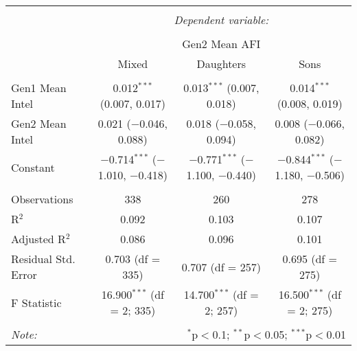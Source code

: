 
\begingroup 
\small 
\begin{tabular}{@{\extracolsep{1pt}}lccc} 
\\[-1.8ex]\hline 
\hline \\[-1.8ex] 
 & \multicolumn{3}{c}{\textit{Dependent variable:}} \\ 
\cline{2-4} 
\\[-1.8ex] & \multicolumn{3}{c}{Gen2 Mean AFI} \\ 
 & Mixed & Daughters & Sons \\ 
\hline \\[-1.8ex] 
 Gen1 Mean Intel & 0.012$^{***}$ (0.007, 0.017) & 0.013$^{***}$ (0.007, 0.018) & 0.014$^{***}$ (0.008, 0.019) \\ 
  Gen2 Mean Intel & 0.021 ($-$0.046, 0.088) & 0.018 ($-$0.058, 0.094) & 0.008 ($-$0.066, 0.082) \\ 
  Constant & $-$0.714$^{***}$ ($-$1.010, $-$0.418) & $-$0.771$^{***}$ ($-$1.100, $-$0.440) & $-$0.844$^{***}$ ($-$1.180, $-$0.506) \\ 
 \hline \\[-1.8ex] 
Observations & 338 & 260 & 278 \\ 
R$^{2}$ & 0.092 & 0.103 & 0.107 \\ 
Adjusted R$^{2}$ & 0.086 & 0.096 & 0.101 \\ 
Residual Std. Error & 0.703 (df = 335) & 0.707 (df = 257) & 0.695 (df = 275) \\ 
F Statistic & 16.900$^{***}$ (df = 2; 335) & 14.700$^{***}$ (df = 2; 257) & 16.500$^{***}$ (df = 2; 275) \\ 
\hline 
\hline \\[-1.8ex] 
\textit{Note:}  & \multicolumn{3}{r}{$^{*}$p$<$0.1; $^{**}$p$<$0.05; $^{***}$p$<$0.01} \\ 
\end{tabular} 
\endgroup 
